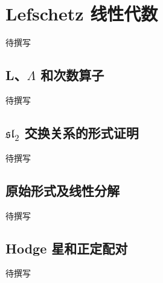 
% 
% 

\section{Lefschetz 线性代数}
\label{g4:sec:1702}

待撰写

\subsection{\texorpdfstring{L、\(\Lambda\) 和次数算子}{L、\GeometryPdfCapitalLambda{} 和次数算子}}
\label{g4:subsec:1702:01}
待撰写

\subsection{\texorpdfstring{\(\mathfrak{sl}_2\) 交换关系的形式证明}{sl₂ 交换关系的形式证明}}
\label{g4:subsec:1702:02}
待撰写

\subsection{原始形式及线性分解}
\label{g4:subsec:1702:03}
待撰写

\subsection{Hodge 星和正定配对}
\label{g4:subsec:1702:04}
待撰写
